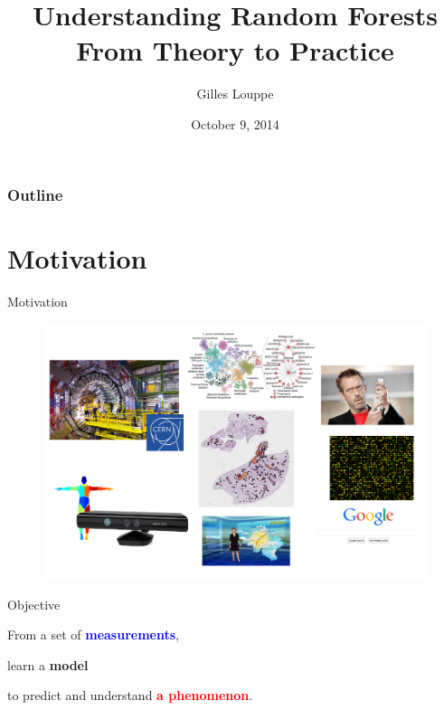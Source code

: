 \documentclass{beamer}
\title{{\bf Understanding Random Forests}\\
From Theory to Practice}
\author{Gilles Louppe}
\institute{Université de Liège, Belgium}
\date{October 9, 2014}
\newcommand{\X}[1]{\textcolor{blue}{#1}}
\newcommand{\y}[1]{\textcolor{red}{#1}}
\newcommand{\model}[1]{\textcolor{mygreen}{#1}}
\begin{document}

\begin{frame}
\titlepage
\end{frame}



\begin{frame}
  \frametitle{Outline}
  \tableofcontents
\end{frame}

\section{Motivation}

\begin{frame}{Motivation}

\begin{figure}
\vspace{-0.5cm}
\includegraphics[scale=0.4]{./figures/motivation.png}
\end{figure}

\end{frame}

\begin{frame}{Objective}

\begin{center}
From a set of {\bf \X{measurements}},

\vspace{1cm}

learn a {\bf \model{model}}

\vspace{1cm}

to predict and understand {\bf \y{a phenomenon}}.

\end{center}

\end{frame}
\end{document}
